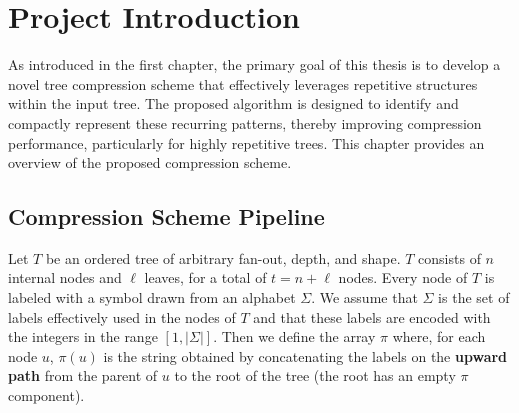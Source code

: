 \chapter{Project Introduction}
As introduced in the first chapter, the primary goal of this thesis is to develop a novel tree compression scheme that effectively leverages repetitive structures within the input tree. The proposed algorithm is designed to identify and compactly represent these recurring patterns, thereby improving compression performance, particularly for highly repetitive trees. This chapter provides an overview of the proposed compression scheme.

\section{Compression Scheme Pipeline}
Let $ T $ be an ordered tree of arbitrary fan-out, depth, and shape. $ T $ consists of $ n $ internal nodes and $ \ell $ leaves, for a total of $ t = n + \ell $ nodes. Every node of $ T $ is labeled with a symbol drawn from an alphabet $ \Sigma $. We assume that $ \Sigma $ is the set of labels effectively used in the nodes of $T$ and that these labels are encoded with the integers in the range $[1, |\Sigma|]$. Then we define the array $\pi$ where, for each node $u$, $\pi(u)$ is the string obtained by concatenating the labels on the \textbf{upward path} from the parent of $u$ to the root of the tree (the root has an empty $\pi$ component).

